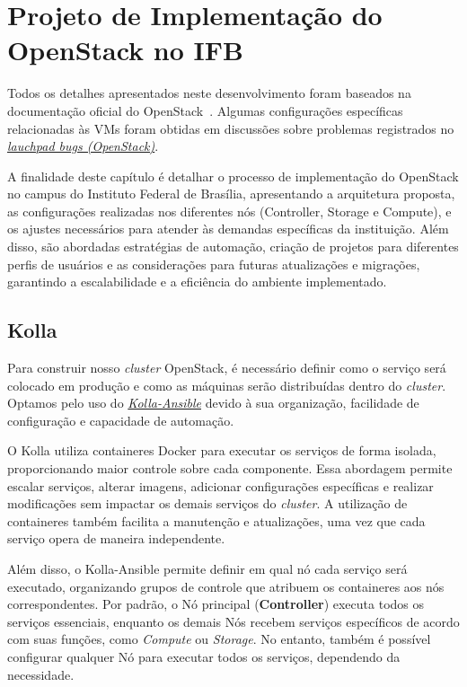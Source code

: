\chapter{Projeto de Implementação do OpenStack no IFB}
\label{ref:implementation_project_openstack_ifb}

Todos os detalhes apresentados neste desenvolvimento foram baseados na documentação oficial do OpenStack~\citep{DocumentacaoOpenstack}. Algumas configurações específicas relacionadas às VMs foram obtidas em discussões sobre problemas registrados no \textit{\href{https://bugs.launchpad.net/openstack/}{lauchpad bugs (OpenStack)}}.

A finalidade deste capítulo é detalhar o processo de implementação do OpenStack no campus do Instituto Federal de Brasília, apresentando a arquitetura proposta, as configurações realizadas nos diferentes nós (Controller, Storage e Compute), e os ajustes necessários para atender às demandas específicas da instituição. Além disso, são abordadas estratégias de automação, criação de projetos para diferentes perfis de usuários e as considerações para futuras atualizações e migrações, garantindo a escalabilidade e a eficiência do ambiente implementado.


\section{Kolla}
Para construir nosso \textit{cluster} OpenStack, é necessário definir como o serviço será colocado em produção e como as máquinas serão distribuídas dentro do \textit{cluster}. Optamos pelo uso do \textit{\href{https://docs.openstack.org/kolla-ansible/latest/}{Kolla-Ansible}} devido à sua organização, facilidade de configuração e capacidade de automação.

O Kolla utiliza containeres Docker para executar os serviços de forma isolada, proporcionando maior controle sobre cada componente. Essa abordagem permite escalar serviços, alterar imagens, adicionar configurações específicas e realizar modificações sem impactar os demais serviços do \textit{cluster}. A utilização de containeres também facilita a manutenção e atualizações, uma vez que cada serviço opera de maneira independente.

Além disso, o Kolla-Ansible permite definir em qual nó cada serviço será executado, organizando grupos de controle que atribuem os containeres aos nós correspondentes. Por padrão, o Nó principal (\textbf{Controller}) executa todos os serviços essenciais, enquanto os demais Nós recebem serviços específicos de acordo com suas funções, como \textit{Compute} ou \textit{Storage}. No entanto, também é possível configurar qualquer Nó para executar todos os serviços, dependendo da necessidade.

